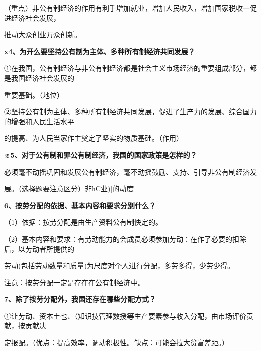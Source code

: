 \documentclass[lang=cn,11pt]{elegantbook}
\newcommand{\daofasym}[1]{{\daofasymbolfont #1}}
\newcommand{\daofasym}[1]{#1}
\begin{document}
（重点）非公有制经济的作用有利手增加就业，增加人民收入，增加国家税收一促进经济社会发展，\par

推动大众创业万众创新。\par

\textbf{x4、为开么要坚持公有制为主体、多种所有制经济共同发展？}\par

\daofasym{①}在我国，公有制经济与非公有制经济都是社会主义市场经济的重要组成部分，都是我国经济社会发展的\par

重要基础。（地位）\par

\daofasym{②}坚持公有制为主体、多种所有制经济共同发展，促进了生产力的发展、综合国力的增强和人民生活水平\par

的提高、为人民当家作主奠定了坚实的物质基础。（作用）\par

\textbf{※5、对于公有制和罪公有制经济，我国的国家政策是怎样的？}\par

必须毫不动摇巩固和发展公有制经济，毫不动摇鼓励、支持、引导非公有制经济发\par

展。（选择题要注意区分）非hC业)[的动度\par

\textbf{6、按劳分配的依据、基本内容和要求分别什么？}\par

（1）依据：按劳分配是由生产资料公有制快定的。\par

（2）基本内容和要求：有劳动能力的会成员必须参加劳动：在作了必要的扣除后，以劳动者所提供的\par

劳动(包括劳动数量和质量)为尺度对个人进行分配，多劳多得，少劳少得。\par

注意：按劳分配一定是存在在公有制经济中。\par

\textbf{7、除了按劳分配外，我国还存在哪些分配方式？}\par

\daofasym{①}让劳动、资本土也、（知识技管理数授等生产要素参与收入分配，由市场评价贡献，按贡献决\par

定报配。（优点：提高效率，调动积极性。缺点：可能会拉大贫富差距。）\par
\end{document}
